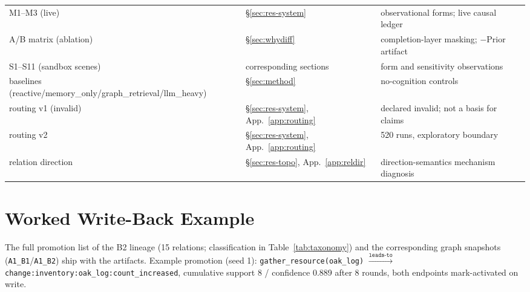 \documentclass[10pt,a4paper]{article}
\begin{document}
\begin{table}[ht]
\begin{tabular}{L{4.6cm}L{3.4cm}L{6.0cm}}
M1--M3 (live) & \S\ref{sec:res-system} & observational forms; live causal ledger \\
A/B matrix (ablation) & \S\ref{sec:whydiff} & completion-layer masking; $-$Prior artifact \\
S1--S11 (sandbox scenes) & corresponding sections & form and sensitivity observations \\
baselines (reactive/memory\_only/graph\_retrieval/llm\_heavy) & \S\ref{sec:method} & no-cognition controls \\
routing v1 (invalid) & \S\ref{sec:res-system}, App.~\ref{app:routing} & declared invalid; not a basis for claims \\
routing v2 & \S\ref{sec:res-system}, App.~\ref{app:routing} & 520 runs, exploratory boundary \\
relation direction & \S\ref{sec:res-topo}, App.~\ref{app:reldir} & direction-semantics mechanism diagnosis \\
\bottomrule
\end{tabular}
\end{table}

\section{Worked Write-Back Example}
\label{app:wb}
The full promotion list of the B2 lineage (15 relations; classification in Table~\ref{tab:taxonomy}) and the corresponding graph snapshots (\texttt{A1\_B1}/\texttt{A1\_B2}) ship with the artifacts. Example promotion (seed 1): \texttt{gather\_resource(oak\_log)} $\xrightarrow{\texttt{leads-to}}$ \texttt{change:inventory:oak\_log:count\_increased}, cumulative support 8 / confidence 0.889 after 8 rounds, both endpoints mark-activated on write.
\end{document}

